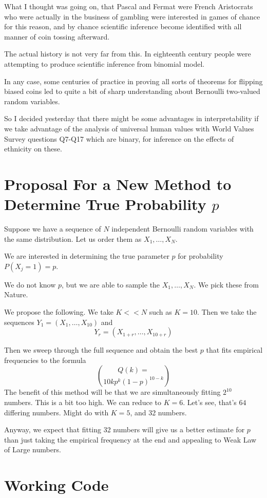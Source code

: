 \documentclass{amsart}
\begin{document}
What I thought was going on, that Pascal and Fermat were French Aristocrats who were actually in the business of gambling were interested in games of chance for this reason, and by chance scientific inference become identified with all manner of coin tossing afterward.

The actual history is not very far from this.  In eighteenth century people were attempting to produce scientific inference from binomial model.

In any case, some centuries of practice in proving all sorts of theorems for flipping biased coins led to quite a bit of sharp understanding about Bernoulli two-valued random variables.

So I decided yesterday that there might be some advantages in interpretability if we take advantage of the analysis of universal human values with World Values Survey questions Q7-Q17 which are binary, for inference on the effects of ethnicity on these.

\section{Proposal For a New Method to Determine True Probability $p$}

Suppose we have a sequence of $N$ independent Bernoulli random variables with the same distribution.  Let us order them as $X_1,\dots, X_N$.  

We are interested in determining the true parameter $p$ for probability $P(X_j=1)=p$.  

We do not know $p$, but we are able to sample the $X_1, \dots, X_N$.  We pick these from Nature.

We propose the following.  We take $K<< N$ such as $K=10$.  Then we take the sequences
$Y_1 = (X_1, \dots, X_{10})$ and 
\[
Y_r = (X_{1+r},\dots, X_{10+r})
\]

Then we sweep through the full sequence and obtain the best $p$ that fits empirical frequencies to the formula
\[
Q(k) = \choose{10}{k}p^k (1-p)^{10-k}
\]
The benefit of this method will be that we are simultaneously fitting $2^{10}$ numbers.  This is a bit too high.  We can reduce to $K=6$.  Let's see, that's $64$ differing numbers.  Might do with $K=5$, and 32 numbers.

Anyway, we expect that fitting 32 numbers will give us a better estimate for $p$ than just taking the empirical frequency at the end and appealing to Weak Law of Large numbers.

\section{Working Code}
\end{document}
